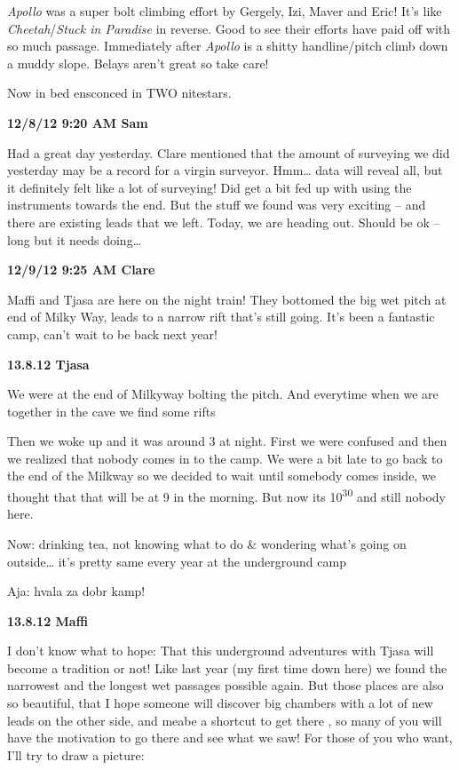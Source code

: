 \emph{Apollo} was a super bolt climbing effort by Gergely, Izi, Maver
and Eric! It's like \emph{Cheetah}/\emph{Stuck in Paradise} in reverse.
Good to see their efforts have paid off with so much passage.
Immediately after \emph{Apollo} is a shitty handline/pitch climb down a
muddy slope. Belays aren't great so take care!

Now in bed ensconced in TWO nitestars.

\textbf{12/8/12 9:20 AM Sam}

Had a great day yesterday. Clare mentioned that the amount of surveying
we did yesterday may be a record for a virgin surveyor. Hmm\ldots{} data
will reveal all, but it definitely felt like a lot of surveying! Did get
a bit fed up with using the instruments towards the end. But the stuff
we found was very exciting -- and there are existing leads that we left.
Today, we are heading out. Should be ok -- long but it needs
doing\ldots{}

\textbf{12/9/12 9:25 AM Clare}

Maffi and Tjasa are here on the night train! They bottomed the big wet
pitch at end of Milky Way, leads to a narrow rift that's still going.
It's been a fantastic camp, can't wait to be back next year!

\textbf{13.8.12 Tjasa}

We were at the end of Milkyway bolting the pitch. And everytime when we
are together in the cave we find some rifts

Then we woke up and it was around 3 at night. First we were confused and
then we realized that nobody comes in to the camp. We were a bit late to
go back to the end of the Milkway so we decided to wait until somebody
comes inside, we thought that that will be at 9 in the morning. But now
its 10\textsuperscript{30} and still nobody here.

Now: drinking tea, not knowing what to do \& wondering what's going on
outside\ldots{} it's pretty same every year at the underground camp

Aja: hvala za dobr kamp!

\textbf{13.8.12 Maffi}

I don't know what to hope: That this underground adventures with Tjasa
will become a tradition or not! Like last year (my first time down here)
we found the narrowest and the longest wet passages possible again. But
those places are also so beautiful, that I hope someone will discover
big chambers with a lot of new leads on the other side, and meabe a
shortcut to get there , so many of you will have the motivation to go
there and see what we saw! For those of you who want, I'll try to draw a
picture:

